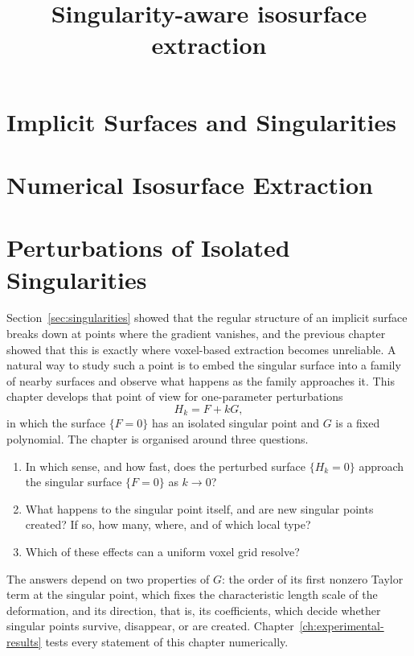 \documentclass[12pt, a4paper, oneside]{book}
\theoremstyle{plain}
\theoremstyle{definition}
\theoremstyle{remark}
\begin{document}

\newpage
\title{Singularity-aware isosurface extraction}
\newpage
\chapter{Implicit Surfaces and Singularities}
\chapter{Numerical Isosurface Extraction}

\chapter{Perturbations of Isolated Singularities}
\label{ch:perturbation-theory}

Section~\ref{sec:singularities} showed that the regular structure of an implicit
surface breaks down at points where the gradient vanishes, and the previous
chapter showed that this is exactly where voxel-based extraction becomes
unreliable. A natural way to study such a point is to embed the singular surface
into a family of nearby surfaces and observe what happens as the family
approaches it. This chapter develops that point of view for one-parameter
perturbations
\[
H_k = F + kG ,
\]
in which the surface $\{F=0\}$ has an isolated singular point and $G$ is a
fixed polynomial. The chapter is organised around three questions.
\begin{enumerate}
    \item[(Q1)] In which sense, and how fast, does the perturbed surface
          $\{H_k=0\}$ approach the singular surface $\{F=0\}$ as $k\to0$?
    \item[(Q2)] What happens to the singular point itself, and are new singular
          points created? If so, how many, where, and of which local type?
    \item[(Q3)] Which of these effects can a uniform voxel grid resolve?
\end{enumerate}
The answers depend on two properties of $G$: the order of its first nonzero
Taylor term at the singular point, which fixes the characteristic length scale
of the deformation, and its direction, that is, its coefficients, which decide
whether singular points survive, disappear, or are created. Chapter~\ref{ch:experimental-results}
tests every statement of this chapter numerically.
\end{document}
